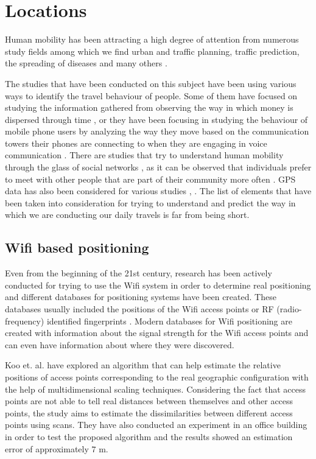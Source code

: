 \chapter{Locations}
\label{locations}
Human mobility has been attracting a high degree of attention from numerous
study fields among which we find urban and traffic planning, traffic prediction,
the spreading of diseases and many others \cite{AsgariGB13} \cite{Brockmann08}.

The studies that have been conducted on this subject have been using various
ways to identify the travel behaviour of people. Some of them have focused on
studying the information gathered from observing the way in which money is
dispersed through time \cite{Brockmann06}, or they have been focusing in
studying the behaviour of mobile phone users by analyzing the way they move
based on the communication towers their phones are connecting to when they are
engaging in voice communication \cite{Barabasi08}. There are studies that try to
understand human mobility through the glass of social networks
\cite{yang2010using}, as it can be observed that individuals prefer to meet with
other people that are part of their community more often
\cite{Musolesi:2007:DMM:1317425.1317433}. GPS data has also been considered for
various studies \cite{cuttone2014inferring}, \cite{5657695}. The list of
elements that have been taken into consideration for trying to understand and
predict the way in which we are conducting our daily travels is far from being
short. 

\section{Wifi based positioning}

Even from the beginning of the 21st century, research has been actively
conducted for trying to use the Wifi system in order to determine real
positioning and different databases for positioning systems have been created.
These databases usually included the positions of the Wifi access points or RF
(radio-frequency) identified fingerprints \cite{Chen:2006:PMP:2166283.2166297}
\cite{Cheng:2005:ACM:1067170.1067195} \cite{Youssef:2005:HWL:1067170.1067193}
\cite{bahl2000radar}. Modern databases for Wifi positioning are created with
information about the signal strength for the Wifi access points and can
even have information about where they were discovered.

Koo et. al. \cite{koo2011autonomous} have explored an algorithm that can help
estimate the relative positions of access points corresponding to the real
geographic configuration with the help of multidimensional scaling techniques.
Considering the fact that access points are not able to tell real distances
between themselves and other access points, the study aims to estimate the
dissimilarities between different access points using scans. They have also
conducted an experiment in an office building in order to test the proposed
algorithm and the results showed an estimation error of approximately $7$ m.

